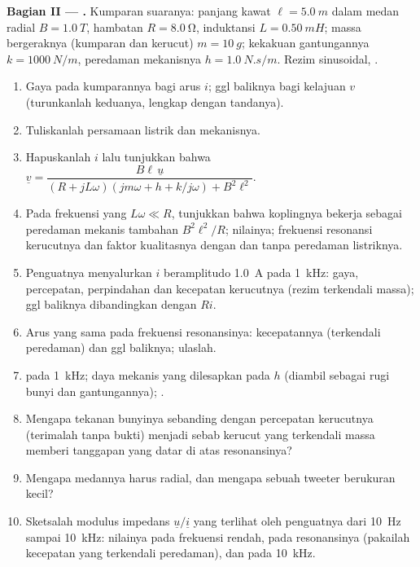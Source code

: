 \begin{problem}
\medskip
\noindent\textbf{Bagian II --- .}
Kumparan suaranya: panjang kawat $\ell = \qty{5.0}{m}$ dalam medan radial $B =
\qty{1.0}{T}$, hambatan $R = \qty{8.0}{\ohm}$, induktansi $L = \qty{0.50}{mH}$;
massa bergeraknya (kumparan dan kerucut) $m = \qty{10}{g}$; kekakuan gantungannya
$k = \qty{1000}{N/m}$, peredaman mekanisnya $h = \qty{1.0}{N.s/m}$. Rezim
sinusoidal, .
\begin{enumerate}[resume]
  \item Gaya pada kumparannya bagi arus $i$; ggl baliknya bagi kelajuan $v$
        (turunkanlah keduanya, lengkap dengan tandanya).
  \item Tuliskanlah persamaan listrik dan mekanisnya.
  \item Hapuskanlah $i$ lalu tunjukkan bahwa
        $\underline v = \dfrac{B\ell\,\underline u}{(R + jL\omega)(jm\omega + h + k/j\omega) + B^2\ell^2}$.
  \item Pada frekuensi yang $L\omega \ll R$, tunjukkan bahwa koplingnya bekerja
        sebagai peredaman mekanis tambahan $B^2\ell^2/R$; nilainya; frekuensi
        resonansi kerucutnya dan faktor kualitasnya dengan dan tanpa
        peredaman listriknya.
  \item Penguatnya menyalurkan $i$ beramplitudo \qty{1.0}{A} pada \qty{1}{kHz}:
         gaya, percepatan, perpindahan dan kecepatan
        kerucutnya (rezim terkendali massa);  ggl baliknya dibandingkan dengan
        $Ri$.
  \item Arus yang sama pada frekuensi resonansinya:  kecepatannya
        (terkendali peredaman) dan ggl baliknya; ulaslah.
  \item {} pada \qty{1}{kHz}; daya mekanis yang dilesapkan pada
        $h$ (diambil sebagai rugi bunyi dan gantungannya); .
  \item Mengapa tekanan bunyinya sebanding dengan percepatan
        kerucutnya (terimalah tanpa bukti) menjadi sebab kerucut yang terkendali massa memberi
        tanggapan yang datar di atas resonansinya?
  \item Mengapa medannya harus radial, dan mengapa sebuah tweeter berukuran kecil?
  \item Sketsalah modulus impedans $\underline u/\underline i$ yang terlihat
        oleh penguatnya dari \qty{10}{Hz} sampai \qty{10}{kHz}: nilainya pada frekuensi
        rendah, pada resonansinya (pakailah kecepatan yang terkendali peredaman),
        dan pada \qty{10}{kHz}.
\end{enumerate}


\end{problem}
